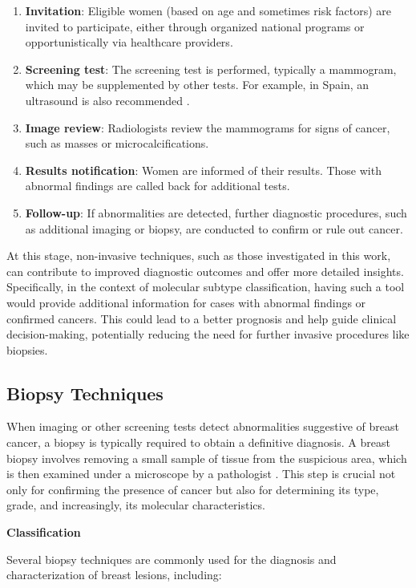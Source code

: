 \documentclass[a4paper,10pt]{book}
\begin{document}
\begin{enumerate}
    \item \textbf{Invitation}: Eligible women (based on age and sometimes risk factors) are invited to participate, either through organized national programs or opportunistically via healthcare providers.
    \item \textbf{Screening test}: The screening test is performed, typically a mammogram, which may be supplemented by other tests. For example, in Spain, an ultrasound is also recommended \cite{noauthor_map_nodate}.
    \item \textbf{Image review}: Radiologists review the mammograms for signs of cancer, such as masses or microcalcifications.
    \item \textbf{Results notification}: Women are informed of their results. Those with abnormal findings are called back for additional tests.
    \item \textbf{Follow-up}: If abnormalities are detected, further diagnostic procedures, such as additional imaging or biopsy, are conducted to confirm or rule out cancer.
\end{enumerate}


At this stage, non-invasive techniques, such as those investigated in this work, can contribute to improved diagnostic outcomes and offer more detailed insights. Specifically, in the context of molecular subtype classification, having such a tool would provide additional information for cases with abnormal findings or confirmed cancers. This could lead to a better prognosis and help guide clinical decision-making, potentially reducing the need for further invasive procedures like biopsies.

\subsection{Biopsy Techniques}

When imaging or other screening tests detect abnormalities suggestive of breast cancer, a biopsy is typically required to obtain a definitive diagnosis. A breast biopsy involves removing a small sample of tissue from the suspicious area, which is then examined under a microscope by a pathologist \cite{DefinitionBiopsyNCI2011}. This step is crucial not only for confirming the presence of cancer but also for determining its type, grade, and increasingly, its molecular characteristics.

\textbf{Classification}

Several biopsy techniques are commonly used for the diagnosis and characterization of breast lesions, including:
\end{document}
